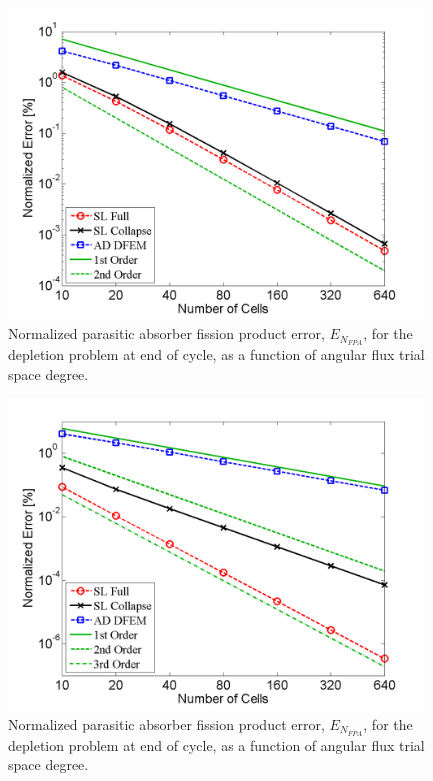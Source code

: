 \begin{figure}[!htp]
\centering
\includegraphics[width=11cm]{chapter5_depletion/FPA_P1_norm_err.png}
\caption{Normalized parasitic absorber fission product error, $E_{N_{FPA}}$, for the depletion problem at end of cycle, as a function of angular flux trial space degree.}
\label{fig:depletion_NFPA_p1}
\end{figure}

\begin{figure}[!hbp]
\centering
\includegraphics[width=11cm]{chapter5_depletion/FPA_P2_norm_err.png}
\caption{Normalized parasitic absorber fission product error, $E_{N_{FPA}}$, for the depletion problem at end of cycle, as a function of angular flux trial space degree.}
\label{fig:depletion_NFPA_p2}
\end{figure}

